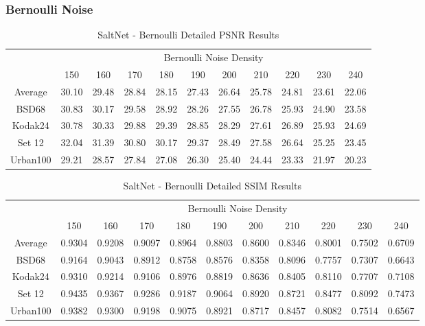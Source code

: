 
\subsubsection{Bernoulli Noise}

\begin{table}[!hbt]
    \centering
    \begin{tabular}{ccccccccccc}
        \hline
        & \multicolumn{10}{c}{Bernoulli Noise Density} \\
        & 150 & 160 & 170 & 180 & 190 & 200 & 210 & 220 & 230 & 240 \\
        \hline
        Average & 30.10 & 29.48 & 28.84 & 28.15 & 27.43 & 26.64 & 25.78 & 24.81 & 23.61 & 22.06 \\
        \hline
        BSD68 & 30.83 & 30.17 & 29.58 & 28.92 & 28.26 & 27.55 & 26.78 & 25.93 & 24.90 & 23.58 \\
        Kodak24 & 30.78 & 30.33 & 29.88 & 29.39 & 28.85 & 28.29 & 27.61 & 26.89 & 25.93 & 24.69 \\
        Set 12 & 32.04 & 31.39 & 30.80 & 30.17 & 29.37 & 28.49 & 27.58 & 26.64 & 25.25 & 23.45 \\
        Urban100 & 29.21 & 28.57 & 27.84 & 27.08 & 26.30 & 25.40 & 24.44 & 23.33 & 21.97 & 20.23 \\
        \hline
    \end{tabular}
    \caption{SaltNet - Bernoulli Detailed PSNR Results}
\end{table}

\begin{table}[!hbt]
    \centering
    \begin{tabular}{ccccccccccc}
        \hline
        & \multicolumn{10}{c}{Bernoulli Noise Density} \\
        & 150 & 160 & 170 & 180 & 190 & 200 & 210 & 220 & 230 & 240 \\
        \hline
        Average & 0.9304 & 0.9208 & 0.9097 & 0.8964 & 0.8803 & 0.8600 & 0.8346 & 0.8001 & 0.7502 & 0.6709 \\
        \hline
        BSD68 & 0.9164 & 0.9043 & 0.8912 & 0.8758 & 0.8576 & 0.8358 & 0.8096 & 0.7757 & 0.7307 & 0.6643 \\
        Kodak24 & 0.9310 & 0.9214 & 0.9106 & 0.8976 & 0.8819 & 0.8636 & 0.8405 & 0.8110 & 0.7707 & 0.7108 \\
        Set 12 & 0.9435 & 0.9367 & 0.9286 & 0.9187 & 0.9064 & 0.8920 & 0.8721 & 0.8477 & 0.8092 & 0.7473 \\
        Urban100 & 0.9382 & 0.9300 & 0.9198 & 0.9075 & 0.8921 & 0.8717 & 0.8457 & 0.8082 & 0.7514 & 0.6567 \\
        \hline
    \end{tabular}
    \caption{SaltNet - Bernoulli Detailed SSIM Results}
\end{table}

